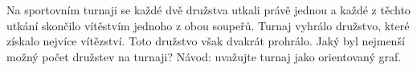 Na sportovním turnaji se každé dvě družstva utkali právě jednou a každé z těchto
utkání skončilo vítěstvím jednoho z obou soupeřů. Turnaj vyhrálo družstvo, které
získalo nejvíce vítězství. Toto družstvo však dvakrát prohrálo. Jaký byl
nejmenší možný počet družstev na turnaji? Návod: uvažujte turnaj jako
orientovaný graf.
